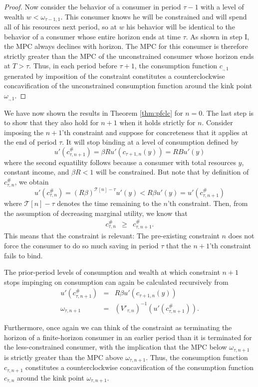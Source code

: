 \documentclass[titlepage]{\econtex}
\providecommand{\wAlt}{\omega}
\begin{document}
\begin{proof}
Now consider the behavior of a consumer in period $\tau-1$ with a level of wealth $w<\wAlt_{\tau-1,1}$.  This consumer knows he will be constrained and will spend all of his resources next period, so at $w$ his behavior will be identical to the behavior of a consumer whose entire horizon ends at time $\tau$.  As shown in step I, the MPC always declines with horizon. The MPC for this consumer is therefore strictly greater than the MPC of the unconstrained consumer whose horizon ends at $T > \tau$.  Thus, in each period before $\tau+1$, the consumption function $c_{.,1}$ generated by imposition of the constraint constitutes a counterclockwise concavification of the unconstrained consumption function around the kink point $\wAlt_{.,1}$. 
	\end{proof}
	
	We have now shown the results in Theorem \ref{thm:pfclc} for $n = 0$. The last step is to show that they also hold for $n+1$ when it holds strictly for $n$. Consider imposing the $n+1$'th constraint and suppose for concreteness that it applies at the end of period $\tau$. It will stop binding at a level of consumption defined by
$$u'(c_{\tau,n+1}^{\#}) = \beta R u'(c_{\tau+1,n}({y})) = RBu'(y)$$ 
where the second equatility follows because a consumer with total resources $y$, constant income, and $\beta R < 1$ will be constrained. But note that by definition of $c^{\#}_{\tau,n}$, we obtain
	$$	u'(c_{\tau,n}^{\#})  =  (R \beta)^{\mathcal{T}[n]-\tau} u'({y})  <  R \beta u'({y}) = u'(c_{\tau,n+1}^{\#})$$
	where $\mathcal{T}[n]-\tau$ denotes the time remaining to the $n$'th constraint. Then, from the assumption of decreasing marginal utility, we know that
	\begin{eqnarray*}
		c_{\tau,n}^{\#} & \geq & c_{\tau,n+1}^{\#}.
	\end{eqnarray*}
	This means that the constraint is relevant: The pre-existing constraint $n$ does not force the consumer to do so much saving in period $\tau$ that the $n+1$'th constraint fails to bind.
	
	The prior-period levels of consumption and wealth at which constraint $n+1$ stops impinging on consumption can again be calculated recursively from
	\begin{eqnarray*}
		u'(c_{\tau,n+1}^{\#}) & = & R\beta u'(c_{\tau+1,n}({y}))
		\\  \wAlt_{\tau,n+1} & = & \left(V'_{\tau,n}\right)^{-1}(u'(c_{\tau,n+1}^{\#})).
	\end{eqnarray*}


	Furthermore, once again we can think of the constraint as terminating
	the horizon of a finite-horizon consumer in an earlier period than it
	is terminated for the less-constrained consumer, with the implication
	that the MPC below $\wAlt_{\tau,n+1}$ is strictly greater than the MPC
	above $\wAlt_{\tau,n+1}$.  Thus, the consumption function $c_{\tau,n+1}$
	constitutes a counterclockwise concavification of the consumption
	function $c_{\tau,n}$ around the kink point $\wAlt_{\tau,n+1}$.
\end{document}
